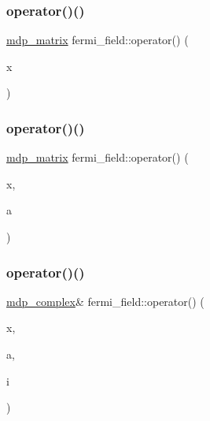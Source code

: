\subsubsection{\texorpdfstring{operator()()}{operator()()}\hspace{0.1cm}{\footnotesize\ttfamily [1/4]}}
{\footnotesize\ttfamily \hyperlink{classmdp__matrix}{mdp\+\_\+matrix} fermi\+\_\+field\+::operator() (\begin{DoxyParamCaption}\item[{\hyperlink{mdp__compatibility__macros_8h_aa6f1179c424e48adef1cedf7c436eb75}{site}}]{x }\end{DoxyParamCaption})\hspace{0.3cm}{\ttfamily [inline]}}

\mbox{\label{classfermi__field_adbdc4231bf39f4d4d350471d587b0bd0}} 
\subsubsection{\texorpdfstring{operator()()}{operator()()}\hspace{0.1cm}{\footnotesize\ttfamily [2/4]}}
{\footnotesize\ttfamily \hyperlink{classmdp__matrix}{mdp\+\_\+matrix} fermi\+\_\+field\+::operator() (\begin{DoxyParamCaption}\item[{\hyperlink{mdp__compatibility__macros_8h_aa6f1179c424e48adef1cedf7c436eb75}{site}}]{x,  }\item[{int}]{a }\end{DoxyParamCaption})\hspace{0.3cm}{\ttfamily [inline]}}

\mbox{\label{classfermi__field_a4f277f994dedde0d25448bb2f2a57b52}} 
\subsubsection{\texorpdfstring{operator()()}{operator()()}\hspace{0.1cm}{\footnotesize\ttfamily [3/4]}}
{\footnotesize\ttfamily \hyperlink{classmdp__complex}{mdp\+\_\+complex}\& fermi\+\_\+field\+::operator() (\begin{DoxyParamCaption}\item[{\hyperlink{mdp__compatibility__macros_8h_aa6f1179c424e48adef1cedf7c436eb75}{site}}]{x,  }\item[{int}]{a,  }\item[{int}]{i }\end{DoxyParamCaption})\hspace{0.3cm}{\ttfamily [inline]}}

